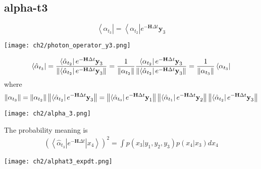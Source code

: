 \subsection{alpha-t3}
\begin{definition}
\begin{equation}
        \left< \alpha_{t_3} \right| = \left< \alpha_{t_2} \right| e^{-\textbf{H}\Delta t} \textbf{y}_3               
\end{equation}
\begin{center}
        \texttt{[image: ch2/photon\_operator\_y3.png]}   
\end{center}
\begin{equation}
        \left< \hat{\alpha}_{t_3} \right| 
	= \frac{\left< \hat{\alpha}_{t_2} \right| e^{-\textbf{H}\Delta t} \textbf{y}_3}{\left\lVert\left< \hat{\alpha}_{t_2} \right| e^{-\textbf{H}\Delta t} \textbf{y}_3\right\rVert} 
	= \frac{1}{\left\lVert\alpha_{t_{2}}\right\rVert} \frac{\left< \alpha_{t_2} \right| e^{-\textbf{H}\Delta t} \textbf{y}_3}{\left\lVert\left< \hat{\alpha}_{t_2} \right| e^{-\textbf{H}\Delta t} \textbf{y}_3\right\rVert} 
	= \frac{1}{\left\lVert\alpha_{t_3}\right\rVert} \left< \alpha_{t_3} \right|
\end{equation}
where
\begin{equation}
        \left\lVert\alpha_{t_3}\right\rVert = \left\lVert\alpha_{t_{2}}\right\rVert \left\lVert\left< \hat{\alpha}_{t_2} \right| e^{-\textbf{H}\Delta t} \textbf{y}_3\right\rVert 
        = \left\lVert\left < \hat{\alpha}_{t_{0}} \right| e^{-\textbf{H}\Delta t} \textbf{y}_1\right\rVert \left\lVert\left< \hat{\alpha}_{t_1} \right| e^{-\textbf{H}\Delta t} \textbf{y}_2\right\rVert \left\lVert\left < \hat{\alpha}_{t_{2}} \right| e^{-\textbf{H}\Delta t} \textbf{y}_3\right\rVert    
\end{equation}
\begin{center}
\texttt{[image: ch2/alpha\_3.png]}
\end{center}
\end{definition}

\begin{definition}
The probability meaning is 
\begin{align*}
        (\left< \hat{\alpha}_{t_3}| e^{-\textbf{H}\Delta t} | x_4 \right>)^2 = \int p(x_3 | y_1, y_2, y_3) p(x_4|x_3) dx_4  
\end{align*}
\begin{center}
        \texttt{[image: ch2/alphat3\_expdt.png]}   
\end{center}
\end{definition}

